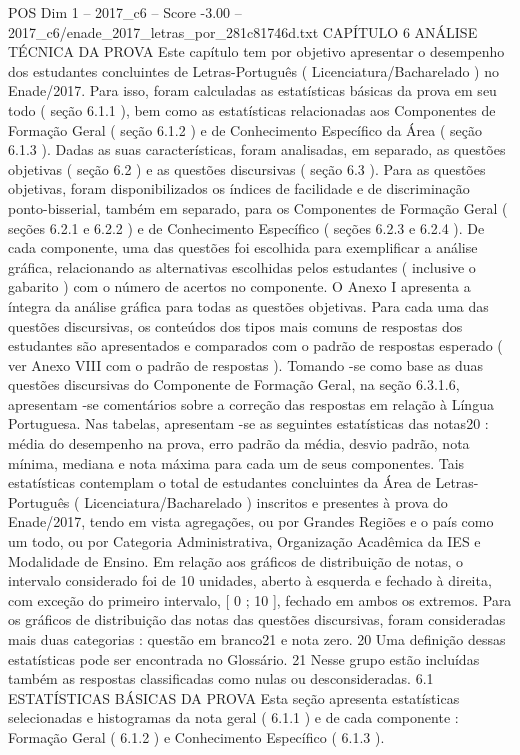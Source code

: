 \begin{textsample}{POS Dim 1 – 2017\_c6 – Score -3.00 – 2017\_c6/enade\_2017\_letras\_por\_281c81746d.txt}  \label{ex:f1_pos_300}
CAPÍTULO 6 ANÁLISE TÉCNICA DA PROVA Este capítulo tem por objetivo apresentar o desempenho dos estudantes concluintes de Letras-Português ( Licenciatura/Bacharelado ) no Enade/2017.
Para isso, foram calculadas as estatísticas básicas da prova em seu todo ( seção 6.1.1 ), bem como as estatísticas relacionadas aos Componentes de Formação Geral ( seção 6.1.2 ) e de Conhecimento Específico da Área ( seção 6.1.3 ).
Dadas as suas características, foram analisadas, em separado, as questões objetivas ( seção 6.2 ) e as questões discursivas ( seção 6.3 ).
Para as questões objetivas, foram disponibilizados os índices de facilidade e de discriminação ponto-bisserial, também em separado, para os Componentes de Formação Geral ( seções 6.2.1 e 6.2.2 ) e de Conhecimento Específico ( seções 6.2.3 e 6.2.4 ).
De cada componente, uma das questões foi escolhida para exemplificar a análise gráfica, relacionando as alternativas escolhidas pelos estudantes ( inclusive o gabarito ) com o número de acertos no componente.
O Anexo I apresenta a íntegra da análise gráfica para todas as questões objetivas.
Para cada uma das questões discursivas, os conteúdos dos tipos mais comuns de respostas dos estudantes são apresentados e comparados com o padrão de respostas esperado ( ver Anexo VIII com o padrão de respostas ).
Tomando -se como base as duas questões discursivas do Componente de Formação Geral, na seção 6.3.1.6, apresentam -se comentários sobre a correção das respostas em relação à Língua Portuguesa.
Nas tabelas, apresentam -se as seguintes estatísticas das notas20 : média do desempenho na prova, erro padrão da média, desvio padrão, nota mínima, mediana e nota máxima para cada um de seus componentes.
Tais estatísticas contemplam o total de estudantes concluintes da Área de Letras-Português ( Licenciatura/Bacharelado ) inscritos e presentes à prova do Enade/2017, tendo em vista agregações, ou por Grandes Regiões e o país como um todo, ou por Categoria Administrativa, Organização Acadêmica da IES e Modalidade de Ensino.
Em relação aos gráficos de distribuição de notas, o intervalo considerado foi de 10 unidades, aberto à esquerda e fechado à direita, com exceção do primeiro intervalo, [ 0 ; 10 ], fechado em ambos os extremos.
Para os gráficos de distribuição das notas das questões discursivas, foram consideradas mais duas categorias : questão em branco21 e nota zero. 20 Uma definição dessas estatísticas pode ser encontrada no Glossário. 21 Nesse grupo estão incluídas também as respostas classificadas como nulas ou desconsideradas. 6.1 ESTATÍSTICAS BÁSICAS DA PROVA Esta seção apresenta estatísticas selecionadas e histogramas da nota geral ( 6.1.1 ) e de cada componente : Formação Geral ( 6.1.2 ) e Conhecimento Específico ( 6.1.3 ).

\end{textsample}

